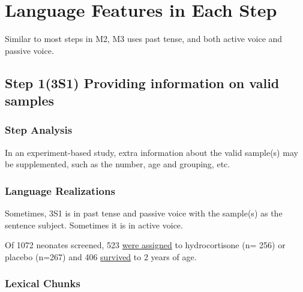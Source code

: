 \documentclass[a4paper]{ctexbook}
\begin{document}
\section{Language Features in Each Step}

Similar to most steps in M2, M3 uses past tense, and both active voice and passive voice.

  \subsection{Step 1(3S1) Providing information on valid samples}
    \subsubsection{Step Analysis}

    In an experiment-based study, extra information about the valid sample(s) may be supplemented, such as the number, age and grouping, etc.

    \subsubsection{Language Realizations}

    Sometimes, 3S1 is in past tense and passive voice with the sample(s) as the sentence subject. Sometimes it is in active voice.

    \begin{eg}{}
      Of 1072 neonates screened, 523 \uline{were assigned} to hydrocortisone (n= 256) or placebo (n=267) and 406 \uline{survived} to 2 years of age.  
    \end{eg}

    \subsubsection{Lexical Chunks}
\end{document}
